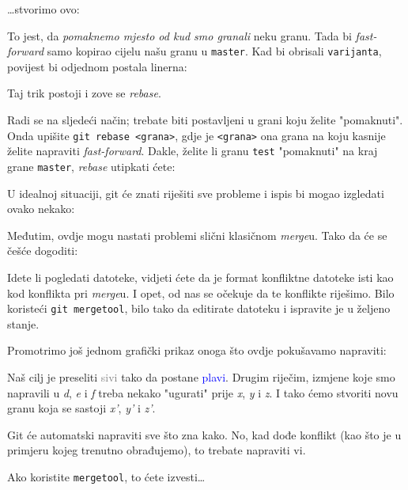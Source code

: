 

\dots{}stvorimo ovo:



To jest, da \emph{pomaknemo mjesto od kud smo granali} neku granu. 
Tada bi \emph{fast-forward} samo kopirao cijelu našu granu u \verb+master+.
Kad bi obrisali \verb+varijanta+, povijest bi odjednom postala linerna:



Taj trik postoji i zove se \emph{rebase}.

Radi se na sljedeći način; trebate biti postavljeni u grani koju želite "pomaknuti". Onda upišite \verb+git rebase <grana>+, gdje je \verb+<grana>+ ona grana na koju kasnije želite napraviti \emph{fast-forward}. 
Dakle, želite li granu \verb+test+ "pomaknuti" na kraj grane \verb+master+, \emph{rebase} utipkati ćete:


U idealnoj situaciji, git će znati riješiti sve probleme i ispis bi mogao izgledati ovako nekako:



Međutim, ovdje mogu nastati problemi slični klasičnom \emph{merge}u.
Tako da će se češće dogoditi:



Idete li pogledati datoteke, vidjeti ćete da je format konfliktne datoteke isti kao kod konflikta pri \emph{merge}u.
I opet, od nas se očekuje da te konflikte riješimo.
Bilo koristeći \verb+git mergetool+, bilo tako da editirate datoteku i ispravite je u željeno stanje. 

Promotrimo još jednom grafički prikaz onoga što ovdje pokušavamo napraviti:



Naš cilj je preseliti \textcolor{gray}{sivi} tako da postane \textcolor{blue}{plavi}.
Drugim riječim, izmjene koje smo napravili u \emph d, \emph e i \emph f treba nekako "ugurati" prije \emph x, \emph y i \emph z.
I tako ćemo stvoriti novu granu koja se sastoji \emph{x'}, \emph{y'} i \emph{z'}.

Git će automatski napraviti sve što zna kako.
No, kad dođe konflikt (kao što je u primjeru kojeg trenutno obrađujemo), to trebate napraviti vi.

Ako koristite \verb+mergetool+, to ćete izvesti\dots

